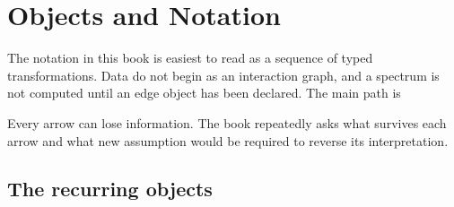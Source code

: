 \chapter*{Objects and Notation}

The notation in this book is easiest to read as a sequence of typed transformations.  Data do not
begin as an interaction graph, and a spectrum is not computed until an edge object has been
declared.  The main path is
\begin{center}
\end{center}
Every arrow can lose information.  The book repeatedly asks what survives each arrow and what new
assumption would be required to reverse its interpretation.

\section*{The recurring objects}

